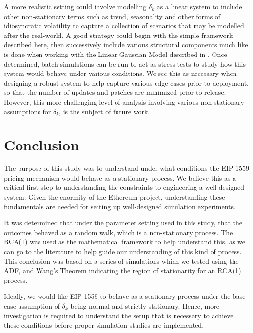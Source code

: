\documentclass[futureinternet,article,submit,moreauthors,dvi2pdf]{mdpi}
\begin{document}
A more realistic setting could involve modelling $\delta_{k}$ as a linear system to include other non-stationary terms such as trend, seasonality and other forms of idiosyncratic volatility to capture a collection of scenarios that may be modelled after the real-world. A good strategy could begin with the simple framework described here, then successively include various structural components much like is done when working with the Linear Gaussian Model described in \cite{Dur12}. Once determined, batch simulations can be run to act as stress tests to study how this system would behave under various conditions. We see this as necessary when designing a robust system to help capture various edge cases prior to deployment,  so that the number of updates and patches are minimized prior to release. However, this more challenging level of analysis involving various non-stationary assumptions for $\delta_{k}$, is the subject of future work. 


\section{Conclusion}
\label{section:conclusion}

The purpose of this study was to understand under what conditions the EIP-1559 pricing mechanism would behave as a stationary process. We believe this as a critical first step to understanding the constraints to engineering a well-designed system. Given the enormity of the Ethereum project, understanding these fundamentals are needed for setting up well-designed simulation experiments.

It was determined that under the parameter setting used in this study, that the outcomes behaved as a random walk, which is a non-stationary process. The RCA(1) was used as the mathematical framework to help understand this, as we can go to the literature to help guide our understanding of this kind of process. This conclusion was based on a series of simulations which we tested using the ADF, and Wang's Theorem indicating the region of stationarity for an RCA(1) process. 

Ideally, we would like EIP-1559 to behave as a stationary process under the base case assumption of $\delta_{k}$ being normal and strictly stationary. Hence, more investigation is required to understand the setup that is necessary to achieve these conditions before proper simulation studies are implemented.

 
\end{document}
